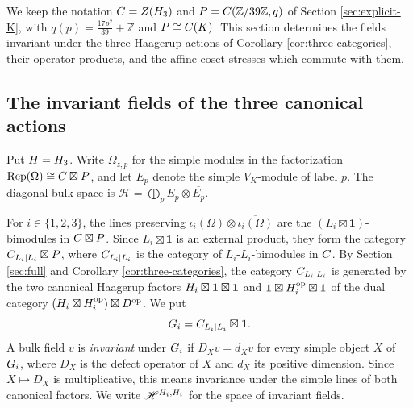 \documentclass[leqno]{article}
\let\cal\relax
\newcommand{\cal}{\mathcal}
\newcommand{\Z}{\ensuremath{\mathbb{Z}}}
\newcommand{\ot}{\otimes}
\DeclareMathOperator{\Rep}{Rep}
\numberwithin{equation}{section}
\begin{document}
We keep the notation $\cal C = Z(\cal H_3)$ and $\cal P = \cal C(\Z/39\Z,q)$ of Section \ref{sec:explicit-K}, with $q(p) = \frac{17p^2}{39}+\Z$ and $\cal P \cong \cal C(K)$. This section determines the fields invariant under the three Haagerup actions of Corollary \ref{cor:three-categories}, their operator products, and the affine coset stresses which commute with them.

\subsection{The invariant fields of the three canonical actions}
\label{subsec:three-haagerup-actions}

Put $\cal H = \cal H_3$. Write $\Omega_{z,p}$ for the simple modules in the factorization $\Rep(\Omega) \cong \cal C \boxtimes \cal P$, and let $E_p$ denote the simple $V_K$-module of label $p$. The diagonal bulk space is $\mathscr H = \bigoplus_p E_p \ot \overline{E_p}$.

For $i \in \{1,2,3\}$, the lines preserving $\iota_i(\Omega)\ot\overline{\iota_i(\Omega)}$ are the $(L_i\boxtimes\mathbf1)$-bimodules in $\cal C\boxtimes\cal P$. Since $L_i\boxtimes\mathbf1$ is an external product, they form the category $\cal C_{L_i|L_i}\boxtimes\cal P$, where $\cal C_{L_i|L_i}$ is the category of $L_i$-$L_i$-bimodules in $\cal C$. By Section \ref{sec:full} and Corollary \ref{cor:three-categories}, the category $\cal C_{L_i|L_i}$ is generated by the two canonical Haagerup factors $\cal H_i\boxtimes\mathbf1\boxtimes\mathbf1$ and $\mathbf1\boxtimes\cal H_i^{\mathrm{op}}\boxtimes\mathbf1$ of the dual category $(\cal H_i\boxtimes\cal H_i^{\mathrm{op}})\boxtimes\cal D^{\mathrm{op}}$. We put
\[
\cal G_i = \cal C_{L_i|L_i}\boxtimes\mathbf1.
\]
A bulk field $v$ is \emph{invariant} under $\cal G_i$ if $D_Xv = d_Xv$ for every simple object $X$ of $\cal G_i$, where $D_X$ is the defect operator of $X$ and $d_X$ its positive dimension. Since $X \mapsto D_X$ is multiplicative, this means invariance under the simple lines of both canonical factors. We write $\mathscr H^{\cal H_i,\cal H_i}$ for the space of invariant fields.
\end{document}
